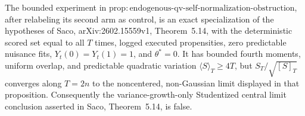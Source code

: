 The bounded experiment in \(\mathrm{prop:endogenous\text{-}qv\text{-}self\text{-}normalization\text{-}obstruction}\), after relabeling its second arm as control, is an exact specialization of the hypotheses of Saco, arXiv:2602.15559v1, Theorem~5.14, with the deterministic scored set equal to all \(T\) times, logged executed propensities, zero predictable nuisance fits, \(Y_t(0)=Y_t(1)=1\), and \(\theta^*=0\). It has bounded fourth moments, uniform overlap, and predictable quadratic variation \(\langle S\rangle_T\ge4T\), but \(S_T/\sqrt{[S]_T}\) converges along \(T=2n\) to the noncentered, non-Gaussian limit displayed in that proposition. Consequently the variance-growth-only Studentized central limit conclusion asserted in Saco, Theorem~5.14, is false.